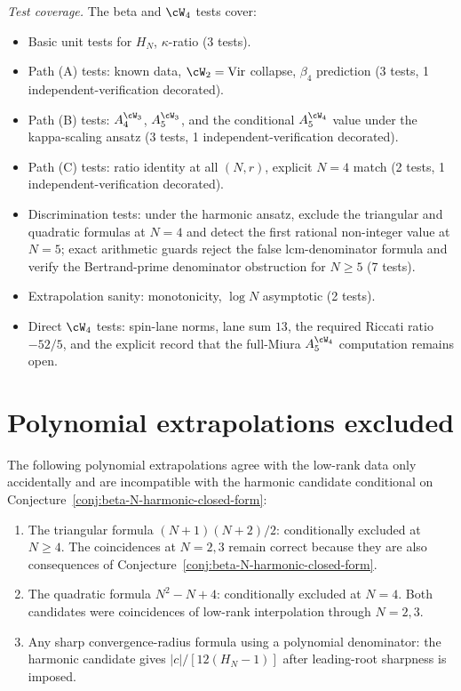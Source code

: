 \emph{Test coverage.} The beta and $\cW_4$ tests cover:
\begin{itemize}[nosep]
\item Basic unit tests for $H_N$, $\kappa$-ratio (3 tests).
\item Path (A) tests: known data, $\cW_2 = \mathrm{Vir}$ collapse,
 $\beta_4$ prediction (3 tests, 1 independent-verification decorated).
\item Path (B) tests: $A_4^{\cW_3}$, $A_5^{\cW_3}$, and the conditional
 $A_5^{\cW_4}$ value under the kappa-scaling ansatz
 (3 tests, 1 independent-verification decorated).
\item Path (C) tests: ratio identity at all $(N, r)$, explicit $N=4$
 match (2 tests, 1 independent-verification decorated).
\item Discrimination tests: under the harmonic ansatz, exclude the
 triangular and quadratic formulas at $N=4$ and detect the first
 rational non-integer value at $N=5$; exact arithmetic guards reject
 the false lcm-denominator formula and verify the Bertrand-prime
 denominator obstruction for $N\geq 5$ (7 tests).
\item Extrapolation sanity: monotonicity, $\log N$ asymptotic (2 tests).
\item Direct $\cW_4$ tests: spin-lane norms, lane sum
 $13$, the required Riccati ratio \(-52/5\), and the explicit record
 that the full-Miura \(A_5^{\cW_4}\) computation remains open.
\end{itemize}

\section{Polynomial extrapolations excluded}
\label{sec:excluded-polynomial-extrapolations}

The following polynomial extrapolations agree with the low-rank data
only accidentally and are incompatible with the harmonic candidate
conditional on Conjecture~\ref{conj:beta-N-harmonic-closed-form}:

\begin{enumerate}[nosep]
\item The triangular formula $(N+1)(N+2)/2$: conditionally excluded at
 $N \ge 4$. The coincidences at $N = 2, 3$ remain correct because
 they are also consequences of
 Conjecture~\ref{conj:beta-N-harmonic-closed-form}.

\item The quadratic formula $N^2 - N + 4$: conditionally excluded at
 $N = 4$. Both candidates were coincidences of low-rank interpolation
 through $N = 2, 3$.

\item Any sharp convergence-radius formula using a polynomial denominator:
 the harmonic candidate gives $|c|/[12(H_N - 1)]$ after leading-root
 sharpness is imposed.
\end{enumerate}

